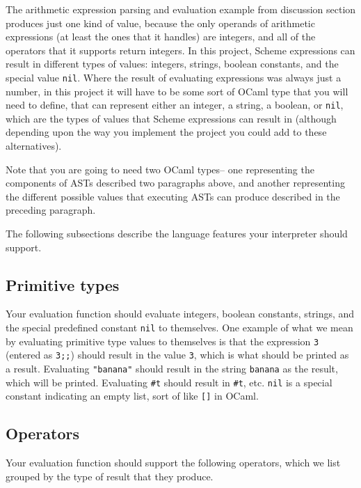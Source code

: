 \documentclass[11pt]{article}
\begin{document}
    The arithmetic expression parsing and evaluation example from discussion
  section produces just one kind of value, because the only operands of
  arithmetic expressions (at least the ones that it handles) are integers,
  and all of the operators that it supports return integers.  In this
  project, Scheme expressions can result in different types of values:
  integers, strings, boolean constants, and the special value \texttt{nil}.
  Where the result of evaluating expressions was always just a number, in
  this project it will have to be some sort of OCaml type that you will need
  to define, that can represent either an integer, a string, a boolean, or
  \texttt{nil}, which are the types of values that Scheme expressions can
  result in (although depending upon the way you implement the project you
  could add to these alternatives).

    Note that you are going to need two OCaml types-- one representing the
  components of ASTs described two paragraphs above, and another
  representing the different possible values that executing ASTs can produce
  described in the preceding paragraph.

    The following subsections describe the language features your interpreter
  should support.

    \subsection{Primitive types}

      Your evaluation function should evaluate integers, boolean constants,
    strings, and the special predefined constant \texttt{nil} to themselves.
    One example of what we mean by evaluating primitive type values to
    themselves is that the expression \texttt{3} (entered as \texttt{3;;})
    should result in the value \texttt{3}, which is what should be printed
    as a result.  Evaluating \texttt{"banana"} should result in the string
    \texttt{banana} as the result, which will be printed.  Evaluating
    \texttt{\#t} should result in \texttt{\#t}, etc.  \texttt{nil} is a
    special constant indicating an empty list, sort of like \texttt{[]} in
    OCaml.

    \subsection{Operators}

      Your evaluation function should support the following operators, which
    we list grouped by the type of result that they produce.
\end{document}
